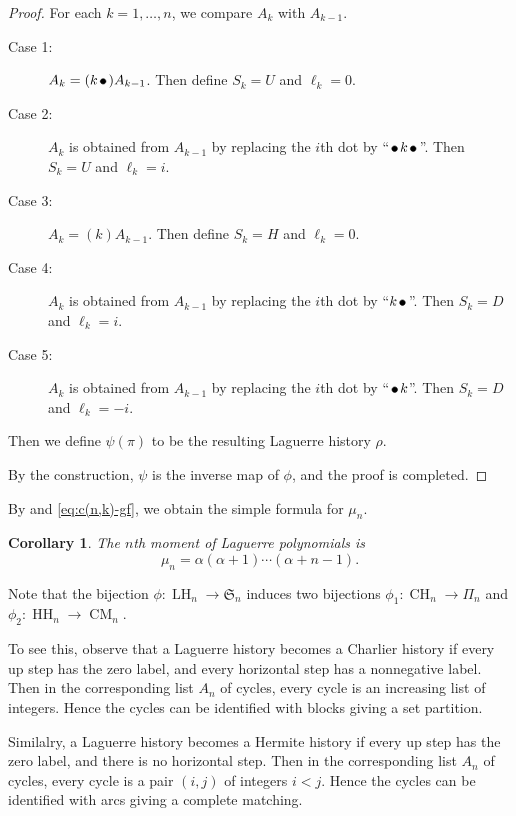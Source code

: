 \documentclass[oneside]{book}
\numberwithin{equation}{section}
\newtheorem{cor}[thm]{Corollary}
\theoremstyle{definition}
\newcommand\LH{\operatorname{LH}}
\newcommand\CH{\operatorname{CH}}
\newcommand\CM{\operatorname{CM}}
\newcommand\HH{\operatorname{HH}}
\newcommand\sym{\mathfrak{S}}
\def\fcirc{\,\tikz\draw[fill] (0,0) circle (2pt);\,}
\begin{document}
\begin{proof}
For each \( k= 1,\dots,n \), we compare \( A_k \) with \( A_{k-1} \).
\begin{description}
\item[Case 1:] \( A_k = (k\fcirc) A_{k-1} \). Then define \( S_k=U \) and \( \ell_k=0 \).
\item[Case 2:] \( A_k \) is obtained from \( A_{k-1} \) by replacing
  the \( i \)th dot by ``\( \fcirc k \fcirc \)''. Then \( S_k=U \) and
  \( \ell_k=i \).
\item[Case 3:] \( A_k = (k) A_{k-1} \). Then define \( S_k=H \) and \( \ell_k=0 \).
\item[Case 4:] \( A_k \) is obtained from \( A_{k-1} \) by replacing
  the \( i \)th dot by ``\( k \fcirc \)''. Then \( S_k=D \) and
  \( \ell_k=i \).
\item[Case 5:] \( A_k \) is obtained from \( A_{k-1} \) by replacing
  the \( i \)th dot by ``\( \fcirc k \)''. Then \( S_k=D \) and
  \( \ell_k=-i \).
\end{description}
Then we define \( \psi(\pi) \) to be the resulting Laguerre history \( \rho \).

By the construction, \( \psi \) is the inverse map of \( \phi \), and
the proof is completed.
\end{proof}

By  and \eqref{eq:c(n,k)-gf}, we obtain the simple
formula for \( \mu_n \).

\begin{cor}
  The \( n \)th moment of Laguerre polynomials is
  \[
    \mu_n = \alpha(\alpha+1) \cdots (\alpha+n-1).
  \]
\end{cor}


Note that the bijection \( \phi:\LH_n\to \sym_n \)
induces two bijections \( \phi_1: \CH_n\to \Pi_n \)
and \( \phi_2: \HH_n\to \CM_n \).

To see this, observe that a Laguerre history becomes a Charlier
history if every up step has the zero label, and every horizontal step
has a nonnegative label. Then in the corresponding list \( A_n \) of
cycles, every cycle is an increasing list of integers. Hence the
cycles can be identified with blocks giving a set partition.

Similalry, a Laguerre history becomes a Hermite history if every up
step has the zero label, and there is no horizontal step. Then in the
corresponding list \( A_n \) of cycles, every cycle is a pair
\( (i,j) \) of integers \( i<j \). Hence the cycles can be identified
with arcs giving a complete matching.
\end{document}
